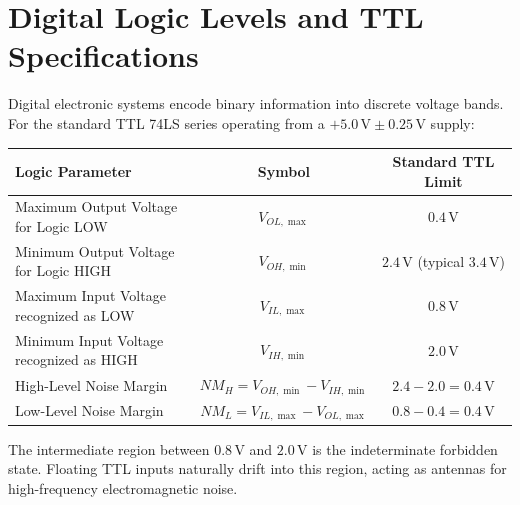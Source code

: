 \section{Digital Logic Levels and TTL Specifications}
Digital electronic systems encode binary information into discrete voltage bands. For the standard TTL 74LS series operating from a $+5.0\,\mathrm{V} \pm 0.25\,\mathrm{V}$ supply:
\begin{center}
\begin{tabular}{lcc}
\toprule
\textbf{Logic Parameter} & \textbf{Symbol} & \textbf{Standard TTL Limit} \\
\midrule
Maximum Output Voltage for Logic LOW & $V_{OL,\max}$ & $0.4\,\mathrm{V}$ \\
Minimum Output Voltage for Logic HIGH & $V_{OH,\min}$ & $2.4\,\mathrm{V}$ (typical $3.4\,\mathrm{V}$) \\
Maximum Input Voltage recognized as LOW & $V_{IL,\max}$ & $0.8\,\mathrm{V}$ \\
Minimum Input Voltage recognized as HIGH & $V_{IH,\min}$ & $2.0\,\mathrm{V}$ \\
High-Level Noise Margin & $NM_H = V_{OH,\min} - V_{IH,\min}$ & $2.4 - 2.0 = 0.4\,\mathrm{V}$ \\
Low-Level Noise Margin & $NM_L = V_{IL,\max} - V_{OL,\max}$ & $0.8 - 0.4 = 0.4\,\mathrm{V}$ \\
\bottomrule
\end{tabular}
\end{center}
The intermediate region between $0.8\,\mathrm{V}$ and $2.0\,\mathrm{V}$ is the indeterminate forbidden state. Floating TTL inputs naturally drift into this region, acting as antennas for high-frequency electromagnetic noise.


